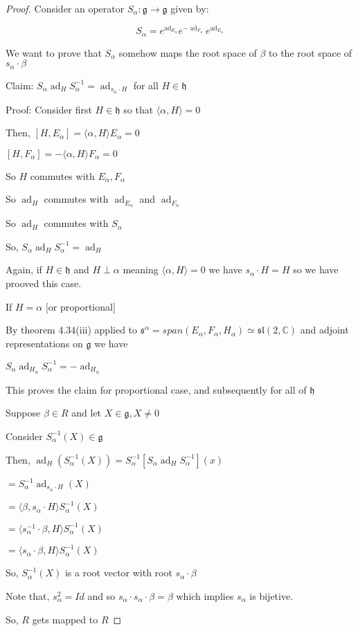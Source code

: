 \documentclass{article}
\theoremstyle{definition}
\newcommand{\ad}{\operatorname{ad}}
\begin{document}
\begin{proof}

    Consider an operator \(S_\alpha: \mathfrak{g} \to \mathfrak{g} \) given by:

    \[
        S_\alpha = e^{\ad_{E_\alpha}}e^{-\ad_{F_\alpha}}e^{\ad_{E_\alpha}}
    \]

    We want to prove that \(S_\alpha\) somehow maps the root space of \(\beta\) to the root space of \(s_\alpha \cdot \beta\) 

    Claim: \(S_\alpha \ad_H S_\alpha^{-1}=\ad_{s_\alpha \cdot H}\) for all \(H\in \mathfrak{h} \) 

    Proof: Consider first \(H\in \mathfrak{h} \) so that \(\langle \alpha ,H \rangle = 0\) 

    Then, \([H,E_\alpha] = \langle \alpha , H \rangle E_\alpha  = 0  \) 

    \([H,F_\alpha ] = -\langle \alpha ,H \rangle F_\alpha =0\) 

    So \(H \) commutes with \(E_\alpha ,F_\alpha\) 

    So \(\ad_H\) commutes with \(\ad_{E_\alpha }\) and \(\ad_{F_\alpha}\) 

    So \(\ad_H\) commutes with \(S_\alpha \) 

    So, \(S_\alpha \ad_H S_\alpha ^{-1}=\ad_H\) 

    Again, if \(H\in \mathfrak{h} \) and \(H\perp \alpha\) meaning \(\langle \alpha ,H \rangle = 0\) we have \(s_\alpha \cdot H = H\) so we have prooved this case.

    If \(H=\alpha\) [or proportional]

    By theorem 4.34(iii) applied to \(\mathfrak{s}^\alpha =span(E_\alpha ,F_\alpha ,H_\alpha ) \simeq \mathfrak{sl}(2,\mathbb{C})  \) and adjoint representations on \(\mathfrak{g} \) we have

    \(S_\alpha \ad_{H_\alpha }S_\alpha ^{-1} = -\ad_{H_\alpha}\) 

    This proves the claim for proportional case, and subsequently for all of \(\mathfrak{h}\) 

    Suppose \(\beta \in R\) and let \(X\in \mathfrak{g} ,X\neq 0\) 

    Consider \(S_\alpha ^{-1} (X)\in \mathfrak{g} \) 

    Then, \(\ad_H(S_\alpha ^{-1} (X)) = S_\alpha ^{-1}  [S_\alpha \ad_H S_\alpha ^{-1}] (x)\) 

    \(=S_\alpha ^{-1} \ad_{s_\alpha \cdot H}(X)\) 

    \(= \langle \beta , s_\alpha \cdot H \rangle S_\alpha^{-1}(X)\) 

    \(= \langle s_\alpha ^{-1}\cdot \beta , H \rangle S_\alpha^{-1}(X) \) 

    \(= \langle s_\alpha \cdot \beta ,H \rangle S_\alpha ^{-1}(X)\) 

    So, \(S_\alpha ^{-1}(X)\) is a root vector with root \(s_\alpha \cdot \beta\) 

    Note that, \(s_\alpha ^2=Id\) and so \(s_\alpha \cdot s_\alpha \cdot \beta =\beta \) which implies \(s_\alpha \) is bijetive.

    So, \(R\) gets mapped to \(R\) 

\end{proof}
\end{document}
